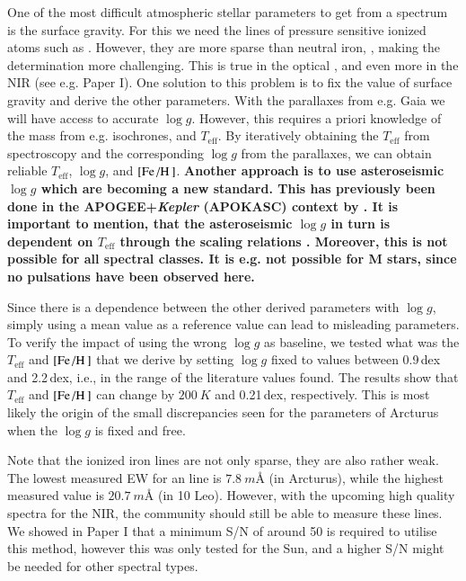 \documentclass{aa}
\begin{document}
One of the most difficult atmospheric stellar parameters to get from a spectrum
is the surface gravity. For this we need the lines of pressure sensitive ionized
atoms such as . However, they are more sparse than neutral iron,
, making the determination more challenging. This is true in the
optical \citep[see e.g. the discussion by][]{Mortier2013c}, and even more in the
NIR (see e.g. Paper I). One solution to this problem is to fix the value of
surface gravity and derive the other parameters. With the parallaxes from e.g.
Gaia \citep{GAIA} we will have access to accurate $\log g$. However, this
requires a priori knowledge of the mass from e.g. isochrones, and
$T_\mathrm{eff}$. By iteratively obtaining the $T_\mathrm{eff}$ from
spectroscopy and the corresponding $\log g$ from the parallaxes, we can obtain
reliable $T_\mathrm{eff}$, $\log g$, and $[\ion{Fe}/\ion{H}]$. {\bf Another
approach is to use asteroseismic $\log g$ which are becoming a new standard.
This has previously been done in the APOGEE+\emph{Kepler} (APOKASC) context by
\citet{Pinsonneault2014,Hawkins2016}. It is important to mention, that the
asteroseismic $\log g$ in turn is dependent on $T_\mathrm{eff}$ through the
scaling relations \citep[see e.g.][]{Kjeldsen1995}. Moreover, this is not
possible for all spectral classes. It is e.g. not possible for M stars, since no
pulsations have been observed here.}

Since there is a dependence between the other derived parameters with $\log g$,
simply using a mean value as a reference value can lead to misleading
parameters. To verify the impact of using the wrong $\log g$ as baseline, we
tested what was the $T_\mathrm{eff}$ and $[\ion{Fe}/\ion{H}]$ that we derive by
setting $\log g$ fixed to values between 0.9\,dex and 2.2\,dex, i.e., in the
range of the literature values found. The results show that $T_\mathrm{eff}$ and
$[\ion{Fe}/\ion{H}]$ can change by $\SI{200}{K}$ and 0.21\,dex, respectively.
This is most likely the origin of the small discrepancies seen for the
parameters of Arcturus when the $\log g$ is fixed and free.

Note that the ionized iron lines are not only sparse, they are also rather weak.
The lowest measured EW for an  line is $\SI{7.8}{m}$\AA{} (in
Arcturus), while the highest measured value is $\SI{20.7}{m}$\AA{} (in 10 Leo).
However, with the upcoming high quality spectra for the NIR, the community
should still be able to measure these  lines. We showed in Paper I
that a minimum S/N of around 50 is required to utilise this method, however this
was only tested for the Sun, and a higher S/N might be needed for other spectral
types.
\end{document}
